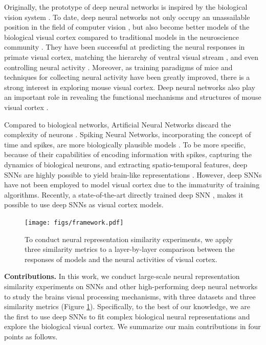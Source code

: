 \documentclass[letterpaper]{article} %
\begin{document}
Originally, the prototype of deep neural networks is inspired by the biological vision system \cite{hubel1959receptive, hubel1962receptive}. To date, deep neural networks not only occupy an unassailable position in the field of computer vision \cite{lecun2015deep}, but also become better models of the biological visual cortex compared to traditional models in the neuroscience community \cite{khaligh2014deep, yamins2014performance, yamins2016using}. They have been successful at predicting the neural responses in primate visual cortex, matching the hierarchy of ventral visual stream \cite{gucclu2015deep, kubilius2019brain, nayebi2018task, kietzmann2019recurrence}, and even controlling neural activity \cite{bashivan2019neural, ponce2019evolving}. Moreover, as training paradigms of mice \cite{zoccolan2009rodent} and techniques for collecting neural activity \cite{de2020large} have been greatly improved, there is a strong interest in exploring mouse visual cortex. Deep neural networks also play an important role in revealing the functional mechanisms and structures of mouse visual cortex \cite{shi2019comparison, cadena2019well, nayebi2022mouse, bakhtiari2021functional, conwell2021neural}.

Compared to biological networks, Artificial Neural Networks discard the complexity of neurons \cite{pham2008control}. Spiking Neural Networks, incorporating the concept of time and spikes, are more biologically plausible models \cite{maass1997networks}. To be more specific, because of their capabilities of encoding information with spikes, capturing the dynamics of biological neurons, and extracting spatio-temporal features, deep SNNs are highly possible to yield brain-like representations \cite{hodgkin1952quantitative, gerstner2002spiking, izhikevich2004model, brette2007simulation, kasabov2013dynamic}. However, deep SNNs have not been employed to model visual cortex due to the immaturity of training algorithms. Recently, a state-of-the-art directly trained deep SNN \cite{fang2021deep}, makes it possible to use deep SNNs as visual cortex models.

\begin{figure}[t]
\centering
\texttt{[image: figs/framework.pdf]}
\caption{To conduct neural representation similarity experiments, we apply three similarity metrics to a layer-by-layer comparison between the responses of models and the neural activities of visual cortex.}
\label{Fig.flowsheet}
\end{figure}

\textbf{Contributions.} In this work, we conduct large-scale neural representation similarity experiments on SNNs and other high-performing deep neural networks to study the brains visual processing mechanisms, with three datasets and three similarity metrics (Figure \ref{Fig.flowsheet}). Specifically, to the best of our knowledge, we are the first to use deep SNNs to fit complex biological neural representations and explore the biological visual cortex. We summarize our main contributions in four points as follows.
\end{document}
